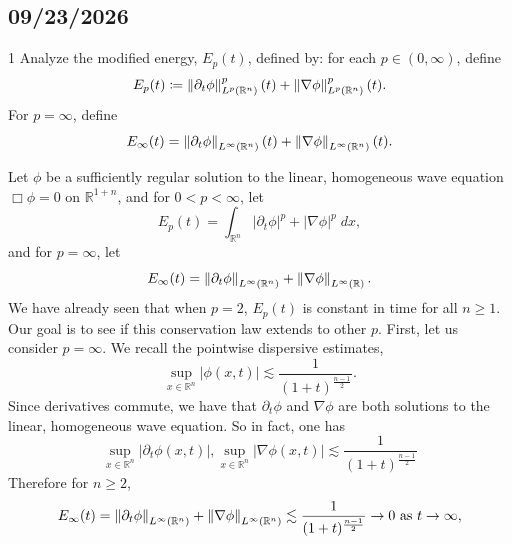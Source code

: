 \documentclass{article}
\begin{document}
\subsection{09/23/2026}
\begin{prb}{1}
	Analyze the modified energy, $E_{p}(t)$, defined by: for each $p \in (0,\infty)$, define 
	\begin{equation*}
		E_{p}(t) \coloneqq \left\Vert \partial_{t}\phi \right\Vert_{L^{p}(\mathbb{R}^{n})}^{p}(t) + \left\Vert \nabla \phi \right\Vert_{L^{p}(\mathbb{R}^{n})}^{p}(t). 
	\end{equation*}
	For $p = \infty$, define 
	\begin{equation*}
		E_{\infty}(t) = \left\Vert \partial_{t}\phi \right\Vert_{L^{\infty}(\mathbb{R}^{n})}(t) + \left\Vert \nabla \phi \right\Vert_{L^{\infty}(\mathbb{R}^{n})}(t). 
	\end{equation*}
\end{prb} 
Let $\phi$ be a sufficiently regular solution to the linear, homogeneous wave equation $\Box\phi = 0$ on $\mathbb{R}^{1 + n}$, and for $0 < p < \infty$, let 
\begin{equation*}
	E_{p}(t) = \int_{\mathbb{R}^{n}}|\partial_{t}\phi|^{p} + |\nabla \phi|^{p}\;dx, 
\end{equation*}
and for $p = \infty$, let 
\begin{equation*}
	E_{\infty}(t) = \left\Vert \partial_{t}\phi \right\Vert_{L^{\infty}(\mathbb{R}^{n})} + \left\Vert \nabla \phi \right\Vert_{L^{\infty}(\mathbb{R})}. 
\end{equation*}
We have already seen that when $p = 2$, $E_{p}(t)$ is constant in time for all $n \geq 1$. Our goal is to see if this conservation law extends to other $p$. First, let us consider $p = \infty$. We recall the pointwise dispersive estimates, 
\begin{equation*}
	\sup_{x \in \mathbb{R}^{n}}|\phi(x, t)| \lesssim \frac{1}{(1 + t)^{\frac{n-1}{2}}}. 
\end{equation*}
Since derivatives commute, we have that $\partial_{t}\phi$ and $\nabla \phi$ are both solutions to the linear, homogeneous wave equation. So in fact, one has 
\begin{equation*}
	\sup_{x \in \mathbb{R}^{n}}|\partial_{t}\phi(x, t)|, \sup_{x \in \mathbb{R}^{n}}|\nabla \phi(x, t)| \lesssim \frac{1}{(1 + t)^{\frac{n - 1}{2}}}
\end{equation*}
Therefore for $n \geq 2$, 
\begin{align*}
	\begin{split}
		E_{\infty}(t) = \left\Vert \partial_{t}\phi \right\Vert_{L^{\infty}(\mathbb{R}^{n})} + \left\Vert \nabla \phi \right\Vert_{L^{\infty}(\mathbb{R}^{n})} \lesssim \frac{1}{(1 + t)^{\frac{n - 1}{2}}} \to 0 \text{ as $t \to \infty$}, 
	\end{split}
\end{align*}
\end{document}
